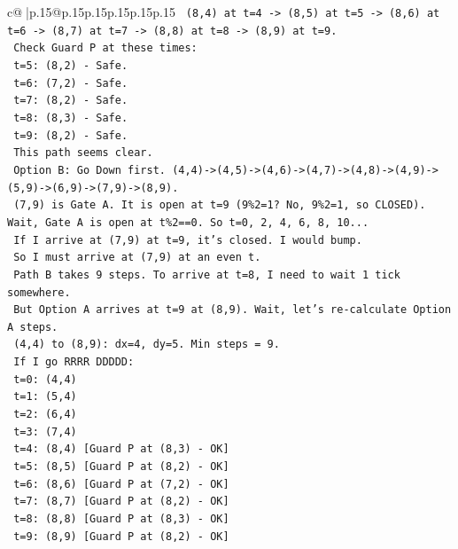 \documentclass{article}
\begin{document}
{\begin{supertabular}{c@{$\;$}|p{.15\linewidth}@{}p{.15\linewidth}p{.15\linewidth}p{.15\linewidth}p{.15\linewidth}p{.15\linewidth}}
{{{\texttt{       (8,4) at t=4 {-}> (8,5) at t=5 {-}> (8,6) at t=6 {-}> (8,7) at t=7 {-}> (8,8) at t=8 {-}> (8,9) at t=9.} \\
\texttt{       Check Guard P at these times:} \\
\texttt{       t=5: (8,2) {-} Safe.} \\
\texttt{       t=6: (7,2) {-} Safe.} \\
\texttt{       t=7: (8,2) {-} Safe.} \\
\texttt{       t=8: (8,3) {-} Safe.} \\
\texttt{       t=9: (8,2) {-} Safe.} \\
\texttt{       This path seems clear.} \\
\texttt{     Option B: Go Down first. (4,4){-}>(4,5){-}>(4,6){-}>(4,7){-}>(4,8){-}>(4,9){-}>(5,9){-}>(6,9){-}>(7,9){-}>(8,9).} \\
\texttt{       (7,9) is Gate A. It is open at t=9 (9\%2=1? No, 9\%2=1, so CLOSED). Wait, Gate A is open at t\%2==0. So t=0, 2, 4, 6, 8, 10...} \\
\texttt{       If I arrive at (7,9) at t=9, it's closed. I would bump.} \\
\texttt{       So I must arrive at (7,9) at an even t.} \\
\texttt{       Path B takes 9 steps. To arrive at t=8, I need to wait 1 tick somewhere.} \\
\texttt{       But Option A arrives at t=9 at (8,9). Wait, let's re{-}calculate Option A steps.} \\
\texttt{       (4,4) to (8,9): dx=4, dy=5. Min steps = 9.} \\
\texttt{       If I go RRRR DDDDD:} \\
\texttt{       t=0: (4,4)} \\
\texttt{       t=1: (5,4)} \\
\texttt{       t=2: (6,4)} \\
\texttt{       t=3: (7,4)} \\
\texttt{       t=4: (8,4) {[}Guard P at (8,3) {-} OK{]}} \\
\texttt{       t=5: (8,5) {[}Guard P at (8,2) {-} OK{]}} \\
\texttt{       t=6: (8,6) {[}Guard P at (7,2) {-} OK{]}} \\
\texttt{       t=7: (8,7) {[}Guard P at (8,2) {-} OK{]}} \\
\texttt{       t=8: (8,8) {[}Guard P at (8,3) {-} OK{]}} \\
\texttt{       t=9: (8,9) {[}Guard P at (8,2) {-} OK{]}} \\
}}}
\end{supertabular}}
\end{document}
